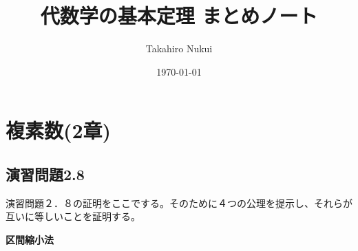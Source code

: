 \documentclass[10pt]{jarticle}
\title{代数学の基本定理 まとめノート}
\author{Takahiro Nukui}
\date{\today}
\begin{document}
\maketitle
\tableofcontents

\newpage
\section{複素数(2章)}
\subsection{演習問題2.8}
演習問題２．８の証明をここでする。そのために４つの公理を提示し、それらが互いに等しいことを証明する。

\begin{itembox}[l]{\textbf{区間縮小法}}
\end{itembox}
\end{document}
